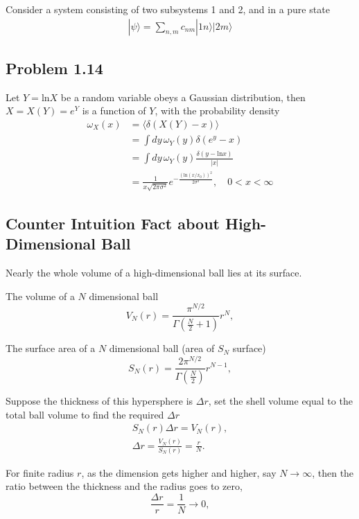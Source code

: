 \documentclass[10pt]{article}
\begin{document}
Consider a system consisting of two subsystems 1 and 2, and in a pure state
\begin{gather}
	|\psi\rangle = \sum_{n,m}c_{nm} |1n\rangle |2m\rangle
\end{gather}


\subsection{Problem 1.14}

Let $Y = \mathrm{ln}X$ be a  random variable obeys a Gaussian distribution, then $X = X(Y) = e^{Y}$ is a function of $Y$, with the probability density
\begin{align*}
	\omega_{X}(x) &= \langle \delta(X(Y) - x) \rangle \\
	&= \int dy \, \omega_Y(y) \delta(e^y - x) \\
	&= \int dy \, \omega_Y(y) \frac{\delta(y - \mathrm{ln}x)}{|x|} \\
	& = \frac{1}{x \sqrt{2\pi \sigma^2}} e^{-\frac{(\mathrm{ln}(x/x_0))^2}{2 \sigma^2}}, \quad 0<x<\infty
\end{align*}


\subsection{Counter Intuition Fact about High-Dimensional Ball}

Nearly the whole volume of a high-dimensional ball lies at its surface.

The volume of a $N$ dimensional ball
\begin{equation}
	V_N(r) = \frac{\pi^{N/2}}{\Gamma(\frac{N}{2}+1)}r^N,
\end{equation}

The surface area of a $N$ dimensional ball (area of $S_N$ surface)
\begin{equation}
	S_N(r) = \frac{2 \pi^{N/2}}{\Gamma(\frac{N}{2})}r^{N-1},
\end{equation}

Suppose the thickness of this hypersphere is $\Delta r$, set the shell volume equal to the total ball volume to find the required $\Delta r$
\begin{align*}
	S_N(r) \Delta r = V_N(r), \\
	\Delta r = \frac{V_N(r)}{S_N(r)} = \frac{r}{N}.
\end{align*}

For finite radius $r$, as the dimension gets higher and higher, say $N \to \infty$, then the ratio between the thickness and the radius goes to zero,
\begin{equation}
	\frac{\Delta r}{r} = \frac{1}{N} \to 0,
\end{equation}
\end{document}
